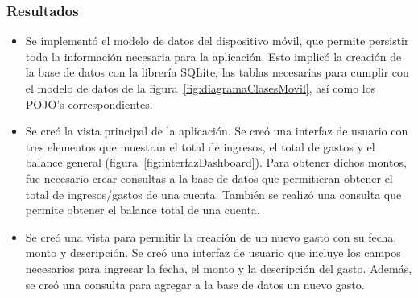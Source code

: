 \subsubsection{Resultados}
\begin{itemize}
\item Se implementó el modelo de datos del dispositivo móvil, que permite persistir toda la información necesaria para la aplicación. Esto implicó la creación de la base de datos con la librería SQLite, las tablas necesarias para cumplir con el modelo de datos de la figura~\ref{fig:diagramaClasesMovil}, así como los POJO's correspondientes.
\item Se creó la vista principal de la aplicación. Se creó una interfaz de usuario con tres elementos que muestran el total de ingresos, el total de gastos y el balance general (figura~\ref{fig:interfazDashboard}). Para obtener dichos montos, fue necesario crear consultas a la base de datos que permitieran obtener el total de ingresos/gastos de una cuenta.  También se realizó una consulta que permite obtener el balance total de una cuenta.
\item Se creó una vista para permitir la creación de un nuevo gasto con su fecha, monto y descripción. Se creó una interfaz de usuario que incluye los campos necesarios para ingresar la fecha, el monto y la descripción del gasto. Además, se creó una consulta para agregar a la base de datos un nuevo gasto.
\end{itemize}

%
%

